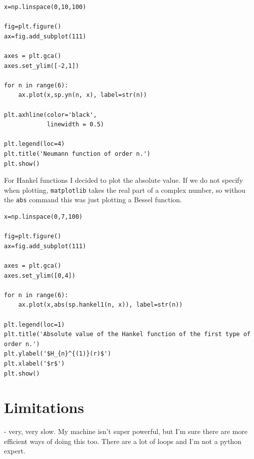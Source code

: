 %
\begin{lstlisting}[caption={Plot of neumann functions of integer order},label={lst:neumann_int_no}]
x=np.linspace(0,10,100)

fig=plt.figure()
ax=fig.add_subplot(111)

axes = plt.gca()
axes.set_ylim([-2,1])

for n in range(6):
    ax.plot(x,sp.yn(n, x), label=str(n))

plt.axhline(color='black',
            linewidth = 0.5)

plt.legend(loc=4)
plt.title('Neumann function of order n.')
plt.show()\end{lstlisting}\par
%
For Hankel functions I decided to plot the absolute value. If we do not specify when plotting, \verb!matplotlib! takes the real part of a complex number, so withou the \verb!abs! command this was just plotting a Bessel function.
%
\begin{lstlisting}[caption={Plot of hankel functions of integer order},label={lst:hankel_int_no}]
x=np.linspace(0,7,100)

fig=plt.figure()
ax=fig.add_subplot(111)

axes = plt.gca()
axes.set_ylim([0,4])

for n in range(6):
    ax.plot(x,abs(sp.hankel1(n, x)), label=str(n))

plt.legend(loc=1)
plt.title('Absolute value of the Hankel function of the first type of order n.')
plt.ylabel('$H_{n}^{(1)}(r)$')
plt.xlabel('$r$')
plt.show()\end{lstlisting}\par

\section{Limitations}
- very, very slow. My machine isn't super powerful, but I'm sure there are more efficient ways of doing this too. There are a lot of loops and I'm not a python expert. 
